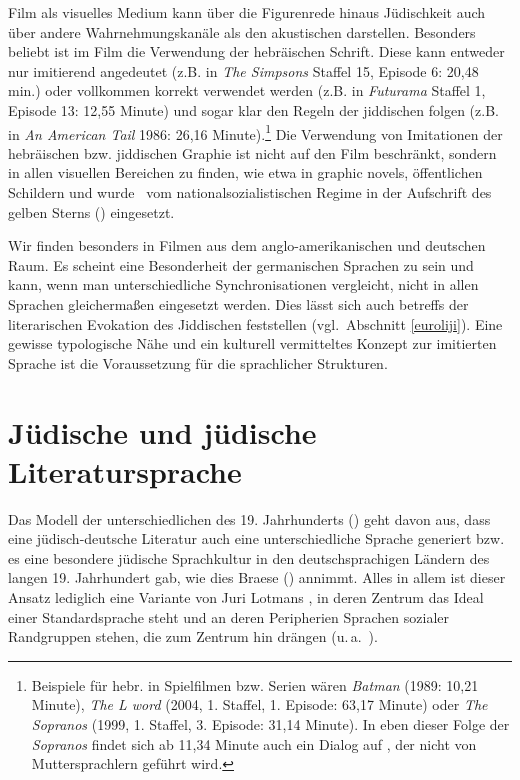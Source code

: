  Film als visuelles Medium kann über die Figurenrede hinaus Jüdischkeit auch über andere Wahrnehmungskanäle als den akustischen darstellen. Besonders beliebt ist im Film die Verwendung der hebräischen Schrift. Diese kann entweder nur imitierend angedeutet (z.B. in 
\textit{The Simpsons} Staffel 15, Episode 6: 20,48 min.) oder vollkommen korrekt verwendet werden (z.B. in
\textit{Futurama} Staffel 1, Episode 13: 12,55 Minute) und sogar klar den Regeln der jiddischen  folgen (z.B. in 
\textit{An American Tail} 1986: 26,16 Minute).\footnote{Beispiele für hebr.  in Spielfilmen bzw. Serien wären
\textit{Batman} (1989: 10,21 Minute), 
\textit{The L word} (2004, 1. Staffel, 1. Episode: 63,17 Minute) oder 
\textit{The Sopranos} (1999, 1. Staffel, 3. Episode: 31,14 Minute). In eben dieser Folge der 
\textit{Sopranos} findet sich ab 11,34 Minute auch ein Dialog auf \hai{{\ZOJ}}, der nicht von Muttersprachlern geführt wird.} Die Verwendung von Imitationen der hebräischen bzw. jiddischen Graphie ist nicht auf den Film beschränkt, sondern in allen visuellen Bereichen zu finden, wie etwa in graphic novels, öffentlichen Schildern und wurde \,%
vom nationalsozialistischen Regime in der Aufschrift des gelben Sterns () eingesetzt. 


Wir finden \hai{{\FiJi}} besonders in Filmen aus dem anglo-amerikanischen und deutschen Raum. Es scheint eine Besonderheit der germanischen Sprachen zu sein und kann,
wenn man unterschiedliche Synchronisationen vergleicht, %
nicht in allen Sprachen gleichermaßen eingesetzt  werden. Dies lässt sich auch betreffs der literarischen Evokation des Jiddischen feststellen (vgl.\, Abschnitt \ref{euroliji}). Eine gewisse typologische Nähe und ein kulturell vermitteltes Konzept zur imitierten Sprache ist die Voraussetzung für die  sprachlicher Strukturen.\\ %


\section{Jüdische  und jüdische Literatursprache}\label{sprachkulturen} 

Das Modell der unterschiedlichen  des 19. Jahrhunderts (\citealt{Linke1996}) geht davon aus, dass eine jüdisch-deutsche Literatur auch eine unterschiedliche Sprache generiert bzw. es eine besondere jüdische Sprachkultur in den deutschsprachigen Ländern des langen 19. Jahrhundert gab, wie dies Braese (\citeyear{Braese2010}) annimmt. Alles in allem ist dieser Ansatz lediglich eine Variante von Juri Lotmans , in deren Zentrum das Ideal einer Standardsprache steht und an deren Peripherien Sprachen sozialer Randgruppen stehen, die zum Zentrum hin drängen (u.\,a.\, \citealt{Lotman1984}).

